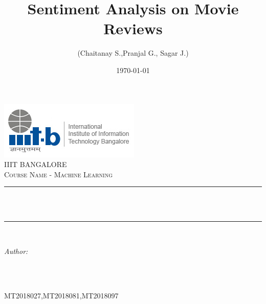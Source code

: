 \documentclass[12pt]{article}
\title{Sentiment Analysis on Movie Reviews}								%
\author{(Chaitanay S.,Pranjal G., Sagar J.)}								%
\date{\today}											%
\makeatletter
\let\thetitle\@title
\let\theauthor\@author
\let\thedate\@date
\makeatother
\begin{document}

\begin{titlepage}
	\centering
    \vspace*{0.5 cm}
    \includegraphics[scale = 0.75]{logo.jpg}\\[1.0 cm]	%
    \textsc{\LARGE IIIT BANGALORE}\\[2.0 cm]	%
	\textsc{\large Course Name - Machine Learning}\\[0.5 cm]				%
	\rule{\linewidth}{0.2 mm} \\[0.4 cm]
	{ \huge \bfseries \thetitle}\\
	\rule{\linewidth}{0.2 mm} \\[1.5 cm]
	
	\begin{minipage}{0.4\textwidth}
		\begin{flushleft} \large
			\emph{Author:}\\
			\theauthor
			\end{flushleft}
			\end{minipage}~
			\begin{minipage}{\textwidth}
			\begin{flushright} \large
			\emph {} \\
			MT2018027,\newline MT2018081,\newline MT2018097 \newline
		\end{flushright}
	\end{minipage}\\[2 cm]
	
	{\large \thedate}\\[2 cm]
 
	\vfill
	
\end{titlepage}


\tableofcontents
\pagebreak
\end{document}
